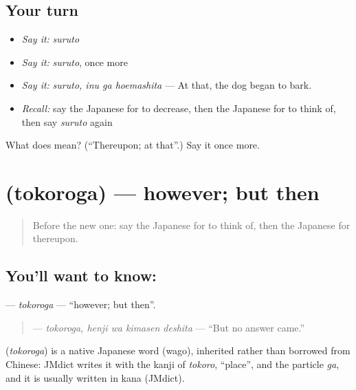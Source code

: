 \subsection*{Your turn}
\begin{itemize}
\raggedright
  \item \emph{Say it:} \emph{suruto}
  \item \emph{Say it:} \emph{suruto}, once more
  \item \emph{Say it:} \emph{suruto, inu ga hoemashita} — At that, the dog began to bark.
  \item \emph{Recall:} say the Japanese for to decrease, then the Japanese for to think of, then say \emph{suruto} again
\end{itemize}

\begin{tcolorbox}[breakable,colback=teal!4,colframe=teal!35!black,title={Before you move on}]
What does  mean? (\textquotedblleft{}Thereupon; at that\textquotedblright{}.) Say it once more.
\end{tcolorbox}
\section[\texorpdfstring{\ja{ところが} (tokoroga)}{ところが (tokoroga)}]{ (tokoroga) — however; but then}

\label{lesson:JA-C315-tokoroga}



\begin{quote}
Before the new one: say the Japanese for to think of, then the Japanese for thereupon.
\end{quote}

\subsection*{You'll want to know: }
\textbf{} — \emph{tokoroga} — \textquotedblleft{}however; but then\textquotedblright{}.

\begin{quote}
\textbf{ } — \emph{tokoroga, henji wa kimasen deshita} — \textquotedblleft{}But no answer came.\textquotedblright{}
\end{quote}

\begin{cousinweb}
\textbf{} (\emph{tokoroga}) is a native Japanese word (wago), inherited rather than borrowed from Chinese: JMdict writes it with the kanji of \emph{tokoro}, \textquotedblleft{}place\textquotedblright{}, and the particle \emph{ga}, and it is usually written in kana (JMdict).
\end{cousinweb}

